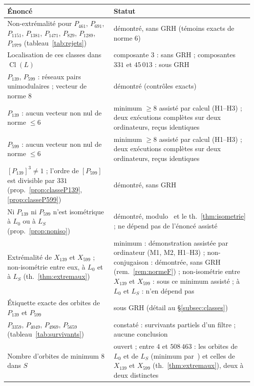 \documentclass[11pt,a4paper]{amsart}
\theoremstyle{plain}
\theoremstyle{definition}
\numberwithin{equation}{section}
\DeclareMathOperator{\Cl}{Cl}
\newcommand{\Lz}{L_{0}}
\newcommand{\LS}{L_{S}}
\begin{document}
\begin{center}
\medskip
\begin{tabular}{>{\raggedright\arraybackslash}p{7.3cm}>{\raggedright\arraybackslash}p{6.9cm}}
\toprule
Énoncé & Statut \\
\midrule
Non-extrémalité pour $P_{461}$, $P_{691}$, $P_{1151}$, $P_{1381}$, $P_{1471}$, $P_{829}$, $P_{1289}$, $P_{1979}$ (tableau~\ref{tab:rejets}) & démontré, sans GRH (témoins exacts de norme $6$) \\
Localisation de ces classes dans $\Cl(L)$ & composante $3$ : sans GRH ; composantes $331$ et $45\,013$ : sous GRH \\
$P_{139}$, $P_{599}$ : réseaux pairs unimodulaires ; vecteur de norme $8$ & démontré (contrôles exacts) \\
$P_{139}$ : aucun vecteur non nul de norme $\le6$ & minimum $\ge8$ assisté par calcul (H1--H3) ; deux exécutions complètes sur deux ordinateurs, reçus identiques \\
$P_{599}$ : aucun vecteur non nul de norme $\le6$ & minimum $\ge8$ assisté par calcul (H1--H3) ; deux exécutions complètes sur deux ordinateurs, reçus identiques \\
$[P_{139}]^3\neq1$ ; l'ordre de $[P_{599}]$ est divisible par $331$ (prop.~\ref{prop:classeP139}, \ref{prop:classeP599}) & démontré, sans GRH \\
Ni $P_{139}$ ni $P_{599}$ n'est isométrique à $\Lz$ ou à $\LS$ (prop.~\ref{prop:noniso}) & démontré, modulo~\cite{Sak26} et le th.~\ref{thm:isometrie} ; ne dépend pas de l'énoncé assisté \\
Extrémalité de $X_{139}$ et $X_{599}$ ; non-isométrie entre eux, à $\Lz$ et à $\LS$ (th.~\ref{thm:extremaux}) & minimum : démonstration assistée par ordinateur (M1, M2, H1--H3) ; non-conjugaison : démontrée, sans GRH (rem.~\ref{rem:normeF}) ; non-isométrie entre $X_{139}$ et $X_{599}$ : sous ce minimum assisté ; à $\Lz$ et $\LS$ : n'en dépend pas \\
Étiquette exacte des orbites de $P_{139}$ et $P_{599}$ & sous GRH (détail au \S\ref{subsec:classes}) \\
$P_{3359}$, $P_{4049}$, $P_{4969}$, $P_{5659}$ (tableau~\ref{tab:survivants}) & constaté : survivants partiels d'un filtre ; aucune conclusion \\
Nombre d'orbites de minimum $8$ dans $S$ & ouvert ; entre $4$ et $508\,463$ : les orbites de $\Lz$ et de $\LS$ (minimum par~\cite{Sak26}) et celles de $X_{139}$ et $X_{599}$ (th.~\ref{thm:extremaux}), deux à deux distinctes \\
\bottomrule
\end{tabular}
\end{center}
\end{document}
